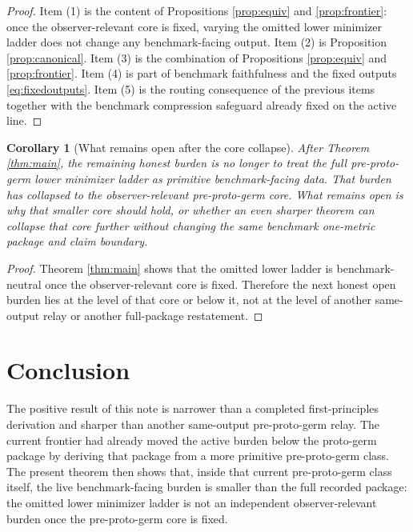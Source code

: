 \documentclass[11pt]{article}
\newtheorem{corollary}{Corollary}
\begin{document}
\begin{proof}
Item (1) is the content of Propositions \ref{prop:equiv} and \ref{prop:frontier}: once the observer-relevant core is fixed, varying the omitted lower minimizer ladder does not change any benchmark-facing output. Item (2) is Proposition \ref{prop:canonical}. Item (3) is the combination of Propositions \ref{prop:equiv} and \ref{prop:frontier}. Item (4) is part of benchmark faithfulness and the fixed outputs \eqref{eq:fixedoutputs}. Item (5) is the routing consequence of the previous items together with the benchmark compression safeguard already fixed on the active line.
\end{proof}

\begin{corollary}[What remains open after the core collapse]
\label{cor:next}
After Theorem \ref{thm:main}, the remaining honest burden is no longer to treat the full pre-proto-germ lower minimizer ladder as primitive benchmark-facing data. That burden has collapsed to the observer-relevant pre-proto-germ core. What remains open is why that smaller core should hold, or whether an even sharper theorem can collapse that core further without changing the same benchmark one-metric package and claim boundary.
\end{corollary}

\begin{proof}
Theorem \ref{thm:main} shows that the omitted lower ladder is benchmark-neutral once the observer-relevant core is fixed. Therefore the next honest open burden lies at the level of that core or below it, not at the level of another same-output relay or another full-package restatement.
\end{proof}

\section{Conclusion}

The positive result of this note is narrower than a completed first-principles derivation and sharper than another same-output pre-proto-germ relay. The current frontier had already moved the active burden below the proto-germ package by deriving that package from a more primitive pre-proto-germ class. The present theorem then shows that, inside that current pre-proto-germ class itself, the live benchmark-facing burden is smaller than the full recorded package: the omitted lower minimizer ladder is not an independent observer-relevant burden once the pre-proto-germ core is fixed.
\end{document}
